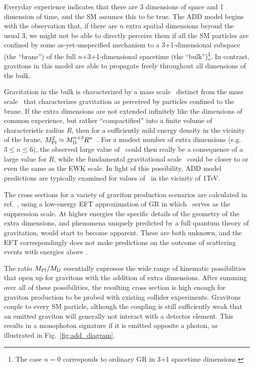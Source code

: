 Everyday experience indicates that there are 3 dimensions of space and 1 dimension of time, and the SM assumes this to be true.
The ADD model begins with the observation that, if there are $n$ extra spatial dimensions beyond the usual 3,
we might not be able to directly perceive them if all the SM particles are confined by some as-yet-unspecified
mechanism to a 3+1-dimensional subspace (the ``brane'') of the full $n$+3+1-dimensional spacetime (the ``bulk'')\footnote{The case $n=0$ corresponds
to ordinary GR in 3+1 spacetime dimensions.}. In contrast, gravitons in this model are able to propagate freely throughout all dimensions of the bulk.

Gravitation in the bulk is characterized by a mass scale \mD\ distinct from the mass scale \mPl\ that
characterizes gravitation as perceived by particles confined to the brane. If the extra dimensions are not extended infinitely like the
dimensions of common experience, but rather ``compactified'' into a finite volume of characteristic radius $R$, then for a sufficiently mild
energy density in the vicinity of the brane, $M_\mathrm{Pl}^{2} \approx M_\mathrm{D}^{n+2} R^{n}$~\cite{ref:S0370-2693(98)00466-3, ref:S0550-3213(99)00044-9}.
For a modest number of extra dimensions (e.g. $3 \leq n \leq 6$), the observed large value of \mPl\ could then really
be a consequence of a large value for $R$, while the fundamental gravitational scale \mD\ could be closer to or even
the same as the EWK scale. In light of this possibility, ADD model predictions are typically examined for values of \mD\ in the vicinity of 1\unit{TeV}.

The cross sections for a variety of graviton production scenarios are calculated in ref.~\cite{ref:S0550-3213(99)00044-9}, using a low-energy EFT
approximation of GR in which \mD\ serves as the suppression scale. At higher energies the specific details of the geometry of the extra dimensions,
and phenomena uniquely predicted by a full quantum theory of gravitation, would start to become apparent. These are both unknown, and the EFT correspondingly
does not make predictions on the outcome of scattering events with energies above \mD.

The ratio $M_\mathrm{Pl} / M_\mathrm{D}$ essentially expresses the wide range of kinematic possibilities that open up for gravitons with the addition
of extra dimensions. After summing over all of these possibilities, the resulting cross section is high enough for graviton production to be probed with existing collider experiments.
Gravitons couple to every SM particle, although the coupling is still sufficiently weak that an emitted graviton will generally not interact with a detector element.
This results in a monophoton signature if it is emitted opposite a photon, as illustrated in Fig.~\ref{fig:add_diagram}.

